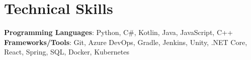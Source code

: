 \section{Technical Skills}
 \begin{itemize}[leftmargin=0.15in, label={}]
    \small{\item{
      \textbf{Programming Languages}{: Python, C\#, Kotlin, Java, JavaScript, C++ } \\
     \textbf{Frameworks/Tools}{: Git, Azure DevOps, Gradle, Jenkins, Unity, .NET Core, React, Spring, SQL, Docker, Kubernetes }\\
    }}
 \end{itemize}